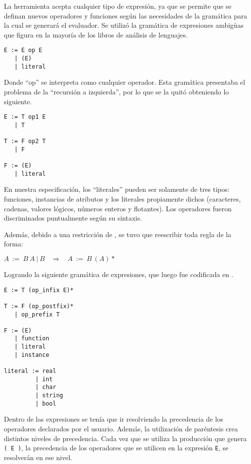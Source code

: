 La herramienta acepta cualquier tipo de expresión, ya que se permite que se definan nuevos operadores y funciones según las necesidades de la gramática para la cual se generará el evaluador. Se utilizó la gramática de expresiones ambigüas que figura en la mayoría de los libros de análisis de lenguajes.

\begin{lstlisting}[backgroundcolor=\color{white}]
E := E op E
   | (E)
   | literal
\end{lstlisting}

Donde ``op'' se interpreta como cualquier operador. Esta gramática presentaba el problema de la ``recursión a izquierda'', por lo que se la quitó obteniendo lo siguiente.

\begin{lstlisting}[backgroundcolor=\color{white}]
E := T op1 E
   | T

T := F op2 T
   | F

F := (E)
   | literal
\end{lstlisting}

En nuestra especificación, los ``literales'' pueden ser solamente de tres tipos: funciones, instancias de atributos y los literales propiamente dichos (caracteres, cadenas, valores lógicos, números enteros y flotantes). Los operadores fueron discriminados puntualmente según su sintaxis.

Además, debido a una restricción de \spirit, se tuvo que reescribir toda regla de la forma:

\begin{center}\textbf{\large{$A\ :=\ B\ A\ |\ B\ \ \ \ \Rightarrow\ \ \ \ A\ :=\ B\ (A)*$}}\end{center}

Logrando la siguiente gramática de expresiones, que luego fue codificada en \spirit.

\begin{lstlisting}[backgroundcolor=\color{white}]
E := T (op_infix E)*

T := F (op_postfix)*
   | op_prefix T

F := (E)
   | function
   | literal
   | instance

literal := real
         | int
         | char
         | string
         | bool
\end{lstlisting}

Dentro de las expresiones se tenía que ir resolviendo la precedencia de los operadores declarados por el usuario. Además, la utilización de paréntesis crea distintos niveles de precedencia. Cada vez que se utiliza la producción que genera \texttt{( E )}, la precedencia de los operadores que se utilicen en la expresión \texttt{E}, se resolverán en ese nivel.

